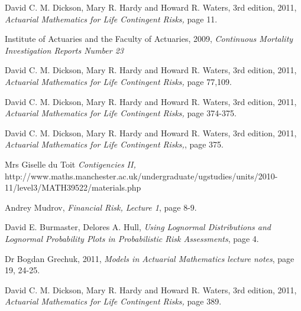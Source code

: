 \documentclass{report}
\begin{document}
{\begin{thebibliography}{99}             %

  David C. M. Dickson, Mary R. Hardy and Howard R. Waters,
    3rd edition, 2011, 
    {\em Actuarial Mathematics for Life Contingent Risks,}
    page 11.


 Institute of Actuaries and the Faculty of Actuaries,
2009,
{\em Continuous Mortality Investigation Reports Number 23}


  David C. M. Dickson, Mary R. Hardy and Howard R. Waters,
    3rd edition, 2011, 
    {\em Actuarial Mathematics for Life Contingent Risks,}
    page 77,109.








  David C. M. Dickson, Mary R. Hardy and Howard R. Waters,
    3rd edition, 2011, 
    {\em Actuarial Mathematics for Life Contingent Risks,}
    page 374-375.

  David C. M. Dickson, Mary R. Hardy and Howard R. Waters,
    3rd edition, 2011, 
    {\em Actuarial Mathematics for Life Contingent Risks,},
    page 375.



  Mrs Giselle du Toit
    {\em Contigencies II,}
    http://www.maths.manchester.ac.uk/undergraduate/ugstudies/units/2010-11/level3/MATH39522/materials.php



  Andrey Mudrov,
    {\em Financial Risk, Lecture 1},
    page 8-9.



  David E. Burmaster, Delores A. Hull,
    {\em Using Lognormal Distributions and Lognormal Probability Plots in Probabilistic Risk Assessments},
    page 4.




  Dr Bogdan Grechuk,
    2011,
    {\em Models in Actuarial Mathematics lecture notes},
    page 19, 24-25.


  David C. M. Dickson, Mary R. Hardy and Howard R. Waters,
    3rd edition, 2011, 
    {\em Actuarial Mathematics for Life Contingent Risks,}
    page 389.



\end{thebibliography}}
\end{document}
